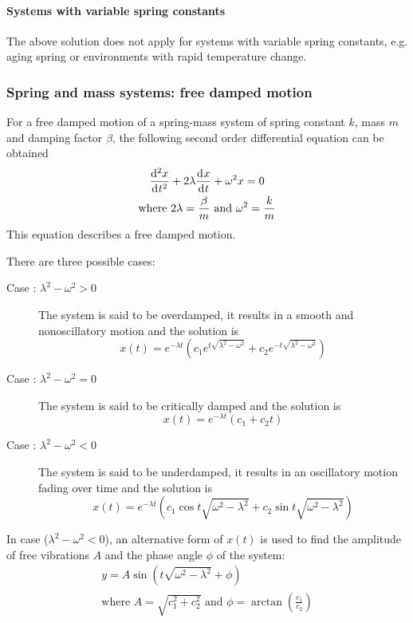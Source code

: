 \documentclass[10pt, twocolumn]{article}
\theoremstyle{definition}
\begin{document}
\paragraph*{Systems with variable spring constants}
The above solution does not apply for systems with variable spring constants, e.g. aging spring or environments with rapid temperature change.


\subsubsection*{Spring and mass systems: free damped motion}
For a free damped motion of a spring-mass system of spring constant \(k\), mass \(m\) and damping factor \(\beta\), the following second order differential equation can be obtained
\begin{gather*}
  \frac{\mathrm{d}^{2} x}{\mathrm{d}^{} t^{2}} + 2\lambda\frac{\mathrm{d}^{} x}{\mathrm{d}^{} t} + \omega^2 x = 0 \\
  \text{where } 2\lambda = \frac{\beta}{m} \text{ and } \omega^2 = \frac{k}{m}
\end{gather*}
This equation describes a free damped motion.

There are three possible cases:
\begin{description}
  \item[Case : \(\lambda^2 - \omega^2 > 0\)] The system is said to be overdamped, it results in a smooth and nonoscillatory motion and the solution is
        \[
          x(t) = e^{-\lambda t} \left( c_1 e^{t\sqrt{\lambda^2 - \omega^2 }} + c_2 e^{-t\sqrt{\lambda^2 - \omega^2 }} \right)
        \]
  \item[Case : \(\lambda^2 - \omega^2 = 0\)] The system is said to be critically damped and the solution is
        \[
          x(t) = e^{-\lambda t} (c_1 + c_2 t)
        \]
  \item[Case : \(\lambda^2 - \omega^2 < 0\)] The system is said to be underdamped, it results in an oscillatory motion fading over time and the solution is
        \[
          x(t) = e^{-\lambda t} \left( c_1 \cos{t\sqrt{\omega^2 - \lambda^2 }} + c_2 \sin{t\sqrt{\omega^2 - \lambda^2 }} \right)
        \]
\end{description}

In case  (\(\lambda^2 - \omega^2 < 0\)), an alternative form of \(x(t)\) is used to find the amplitude of free vibrations \(A\) and the phase angle \(\phi\) of the system:
\begin{gather*}
  y = A\sin(t\sqrt{\omega^2 - \lambda^2 } + \phi) \\
  \text{where } A = \sqrt{c_1 ^2 + c_2 ^2 } \text{ and } \phi = \arctan\left( \frac{c_1 }{c_2 } \right)
\end{gather*}
\end{document}
